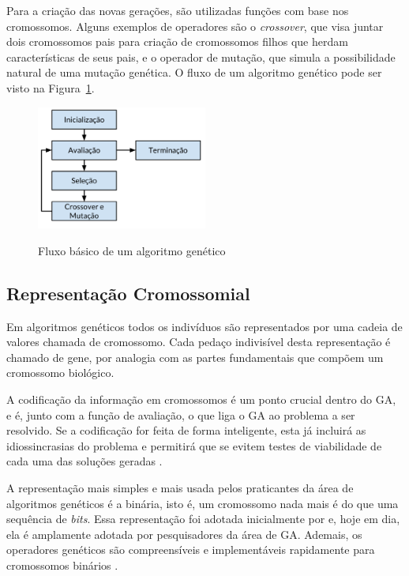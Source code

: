 \documentclass[12pt,oneside,a4paper,english,french,spanish,brazil,]{abntex2}
\begin{document}
Para a criação das novas gerações, são utilizadas funções com base nos cromossomos. Alguns exemplos de operadores são o \textit{crossover}, que visa juntar dois cromossomos pais para criação de cromossomos filhos que herdam características de seus pais, e o operador de mutação, que simula a possibilidade natural de uma mutação genética. O fluxo de um algoritmo genético pode ser visto na Figura~\ref{fig:GA_Fluxo}.

\begin{figure}[ht]
\centering
\caption{Fluxo básico de um algoritmo genético}
\includegraphics[width=0.5\textwidth]{imagens/GA_Fluxo.pdf}
\label{fig:GA_Fluxo}
\end{figure}

\subsection{Representação Cromossomial}

Em algoritmos genéticos todos os indivíduos são representados por uma cadeia de valores chamada de cromossomo. Cada pedaço indivisível desta representação é chamado de gene, por analogia com as partes fundamentais que compõem um cromossomo biológico.

A codificação da informação em cromossomos é um ponto crucial dentro do GA, e é, junto com a função de avaliação, o que liga o GA ao problema a ser resolvido. Se a codificação for feita de forma inteligente, esta já incluirá as idiossincrasias do problema e permitirá que se evitem testes de viabilidade de cada uma das soluções geradas \cite{linden:2008}.

A representação mais simples e mais usada pelos praticantes da área de algoritmos genéticos é a binária, isto é, um cromossomo nada mais é do que uma sequência de \textit{bits}. Essa representação foi adotada inicialmente por \citet{holland:1992} e, hoje em dia, ela é amplamente adotada por pesquisadores da área de GA. Ademais, os operadores genéticos são compreensíveis e implementáveis rapidamente para cromossomos binários \cite{linden:2008}.
\end{document}
